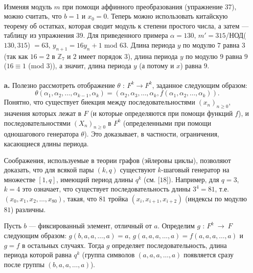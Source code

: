 \documentclass{mai_book}
\begin{document}
 \\

Изменяя модуль $m$ при помощи аффинного преобразования  (упражнение 37), можно считать, что $b = 1$ и $x_0 = 0$. Теперь можно  использовать китайскую теорему об остатках, которая сводит модуль к степени простого числа, а затем --- таблицу из упражнения 39. Для приведенного примера $\alpha = 130$, $m' = 315$/НОД($130,315$) $ = 63$, $y_{n+1} = 16y_n + 1$ mod $63$. Длина периода $y$ по модулю $7$ равна $3$ (так как $16 = 2$ в $\mathbb{Z}_7$ и $2$ имеет порядок $3$), длина периода $y$ по модулю $9$ равна $9$ ($16 \equiv 1$ (mod $3$)), а значит, длина периода $y$ (а потому и $x$) равна $9$. \\

 \\

\textbf{a. } Полезно рассмотреть отображение $\theta$ : $F^k \to F^k$, заданное следующим образом:
\begin{equation*}
	\theta ({\alpha}_1,{\alpha}_2,\ldots ,{\alpha}_{k-1}, {\alpha}_k) = ({\alpha}_2,{\alpha}_3,\ldots ,{\alpha}_k,f({\alpha}_1,{\alpha}_2,\ldots ,{\alpha}_k)).
\end{equation*}
Понятно, что существует биекция между последовательностями $(x_n)_{n \ge 0}$, значения которых лежат в $F$ (и которые определяются при помощи функций $f$), и последовательностями $(X_n)_{n \ge 0}$ в $F^k$  (определенными при помощи одношагового генератора $\theta$). Это доказывает, в частности, ограничения, касающиеся длины периода. \par
Соображения, используемые в теории графов (эйлеровы циклы), позволяют доказать, что для всякой пары $(k,q)$ существуют $k$-шаговый генератор на множестве $[1,q]$, имеющий период длины $q^k$ (см. [$18$]). Например, для $q = 3$, $k = 4$ это означает, что существует последовательность длины $3^4 = 81$, т.е. $(x_0,x_1,x_2,\ldots ,x_{80})$, такая, что $81$ тройка $(x_i,x_{i+1},x_{i+2})$ (индексы по модулю $81$) различны. \par
Пусть $b$ --- фиксированный элемент, отличный от $a$. Определим $g$ : $F^k~\to~F$ следующим образом: $g(b,a,a,\ldots ,a) = a, \, g(a,a,a,\ldots ,a) = f(a,a,a,\ldots ,a)$ и $g = f$ в остальных случаях. Тогда $g$ определяет последовательность, длина периода которой равна $q^k$ (группа символов $(a,a,a,\ldots ,a)$ появляется сразу после группы $(b,a,a,\ldots ,a)$). \smallskip
\end{document}
